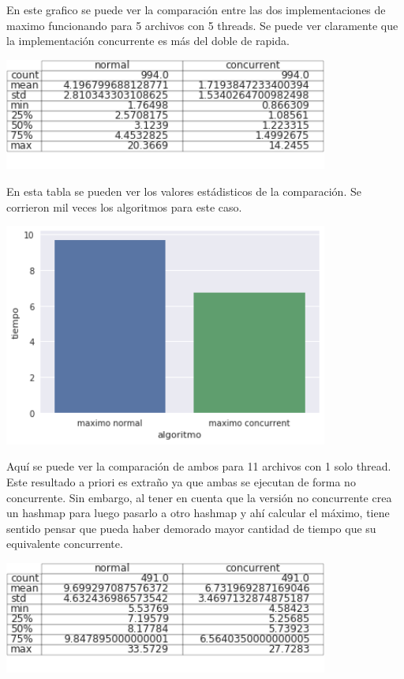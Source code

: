 En este grafico se puede ver la comparación entre las dos implementaciones de maximo funcionando
para 5 archivos con 5 threads. Se puede ver claramente que la implementación concurrente
es más del doble de rapida.

\begin{center}
\includegraphics[width=0.8\textwidth]{imagenes/descplot.png}
\end{center}

En esta tabla se pueden ver los valores estádisticos de la comparación. Se
corrieron mil veces los algoritmos para este caso.

\begin{center}
\includegraphics[width=0.8\textwidth]{imagenes/maxvsmax1thread.png}
\end{center}

Aquí se puede ver la comparación de ambos para 11 archivos con 1 solo thread.\\
Este resultado a priori es extraño ya que ambas se ejecutan de forma no concurrente. Sin embargo, al tener en cuenta que la versión no concurrente crea un hashmap para luego pasarlo a otro hashmap y ahí calcular el máximo, tiene sentido pensar que pueda haber demorado mayor cantidad de tiempo que su equivalente concurrente.

\begin{center}
\includegraphics[width=0.8\textwidth]{imagenes/descplot2.png}
\end{center}


